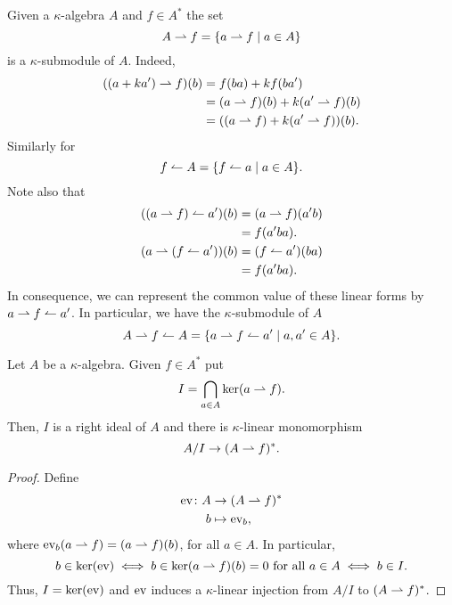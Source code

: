\begin{rem}\label{rem:A-rharpoon-f-lharpoon A}
    Given a $\kappa$-algebra $A$ and $f\in A^*$ the set
    $$
        A\rightharpoonup f = \{a\rightharpoonup f\mid a\in A\}
    $$
    is a $\kappa$-submodule of $A$. Indeed,
    \begin{align*}
        ((a + ka')\rightharpoonup f)(b) &= f(ba) + kf(ba')\\
            &= (a\rightharpoonup f)(b) + k(a'\rightharpoonup f)(b)\\
            &= ((a\rightharpoonup f) + k(a'\rightharpoonup f))(b).
    \end{align*}
    Similarly for
    $$
        f\leftharpoonup A = \{f\leftharpoonup a\mid a\in A\}.
    $$
    Note also that
    \begin{align*}
        ((a\rightharpoonup f)\leftharpoonup a')(b) &= (a\rightharpoonup f)(a'b)\\
            &= f(a'ba).\\
        (a\rightharpoonup(f\leftharpoonup a'))(b) &= (f\leftharpoonup a')(ba)\\
            &= f(a'ba).
    \end{align*}
    In consequence, we can represent the common value of these linear forms by $a\rightharpoonup f\leftharpoonup a'$. In particular, we have the $\kappa$-submodule of $A$
    $$
        A\rightharpoonup f\leftharpoonup A
            = \{a\rightharpoonup f\leftharpoonup a'\mid a,a'\in A\}.
    $$
\end{rem}

\begin{lem}
    Let $A$ be a $\kappa$-algebra. Given $f\in A^*$ put
    $$
        I = \bigcap_{a\in A}{\ker (a\rightharpoonup f)}.
    $$
    Then, $I$ is a right ideal of $A$ and there is $\kappa$-linear monomorphism
    $$
        A/I\to(A\rightharpoonup f)^*.
    $$
\end{lem}

\begin{proof}
    Define
    \begin{align*}
        \text{\rm ev}\colon A&\to(A\rightharpoonup f)^*\\
        b&\mapsto\text{\rm ev}_b,
    \end{align*}
    where $\text{\rm ev}_b(a\rightharpoonup f)=(a\rightharpoonup f)(b)$, for all $a\in A$. In particular,
    $$
        b\in\ker(\text{\rm ev}) \iff b\in\ker(a\rightharpoonup f)(b)=0 \text{ for all }a\in A \iff b\in I.
    $$
    Thus, $I=\ker(\text{\rm ev})$ and $\text{\rm ev}$ induces a $\kappa$-linear injection from $A/I$ to $(A\rightharpoonup f)^*$.
\end{proof}

